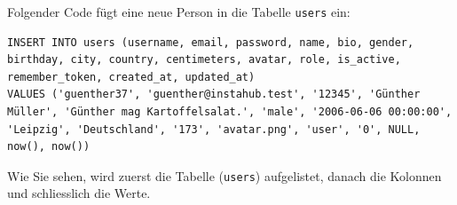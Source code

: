 \begin{myexample}
\label{ex:sql-insert}
Folgender Code fügt eine neue Person in die Tabelle \texttt{users} ein:
\begin{lstlisting}
INSERT INTO users (username, email, password, name, bio, gender, birthday, city, country, centimeters, avatar, role, is_active, remember_token, created_at, updated_at) 
VALUES ('guenther37', 'guenther@instahub.test', '12345', 'Günther Müller', 'Günther mag Kartoffelsalat.', 'male', '2006-06-06 00:00:00', 'Leipzig', 'Deutschland', '173', 'avatar.png', 'user', '0', NULL, now(), now())
\end{lstlisting}
Wie Sie sehen, wird zuerst die Tabelle (\texttt{users}) aufgelistet, danach die Kolonnen und schliesslich die Werte.
\end{myexample}

